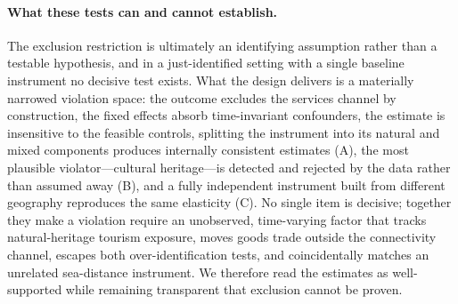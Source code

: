 \paragraph{What these tests can and cannot establish.} The exclusion
restriction is ultimately an identifying assumption rather than a testable
hypothesis, and in a just-identified setting with a single baseline instrument
no decisive test exists. What the design delivers is a materially narrowed
violation space: the outcome excludes the services channel by construction,
the fixed effects absorb time-invariant confounders, the estimate is
insensitive to the feasible controls, splitting the instrument into its
natural and mixed components produces internally consistent estimates (A),
the most plausible violator---cultural heritage---is detected and rejected by
the data rather than assumed away (B), and a fully independent instrument
built from different geography reproduces the same elasticity (C). No single
item is decisive; together they make a violation require an unobserved,
time-varying factor that tracks natural-heritage tourism exposure, moves
goods trade outside the connectivity channel, escapes both
over-identification tests, and coincidentally matches an unrelated
sea-distance instrument. We therefore read the estimates as well-supported
while remaining transparent that exclusion cannot be proven.

